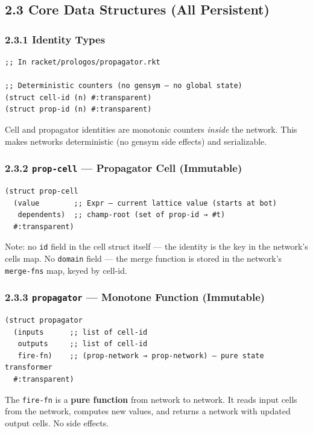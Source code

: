 \documentclass[11pt]{article}
\begin{document}
\subsection{2.3 Core Data Structures (All Persistent)}
\label{sec:orgcd49b2a}

\subsubsection{2.3.1 Identity Types}
\label{sec:org2a46256}

\begin{verbatim}
;; In racket/prologos/propagator.rkt

;; Deterministic counters (no gensym — no global state)
(struct cell-id (n) #:transparent)
(struct prop-id (n) #:transparent)
\end{verbatim}

Cell and propagator identities are monotonic counters \emph{inside} the network.
This makes networks deterministic (no gensym side effects) and serializable.
\subsubsection{2.3.2 \texttt{prop-cell} — Propagator Cell (Immutable)}
\label{sec:org1d97961}

\begin{verbatim}
(struct prop-cell
  (value        ;; Expr — current lattice value (starts at bot)
   dependents)  ;; champ-root (set of prop-id → #t)
  #:transparent)
\end{verbatim}

Note: no \texttt{id} field in the cell struct itself — the identity is the key
in the network's cells map. No \texttt{domain} field — the merge function is
stored in the network's \texttt{merge-fns} map, keyed by cell-id.
\subsubsection{2.3.3 \texttt{propagator} — Monotone Function (Immutable)}
\label{sec:org1e1430a}

\begin{verbatim}
(struct propagator
  (inputs      ;; list of cell-id
   outputs     ;; list of cell-id
   fire-fn)    ;; (prop-network → prop-network) — pure state transformer
  #:transparent)
\end{verbatim}

The \texttt{fire-fn} is a \textbf{pure function} from network to network. It reads input
cells from the network, computes new values, and returns a network with
updated output cells. No side effects.
\end{document}
